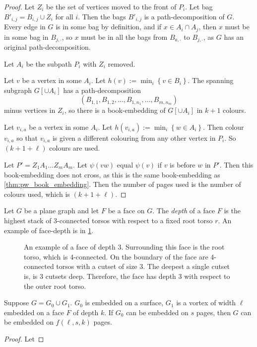 \begin{proof}
	Let $Z_i$ be the set of vertices moved to the front of $P_i$. Let bag $B'_{i,j} = B_{i,j} \cup Z_i$ for all $i$. Then the bags $B'_{i,j}$ is a path-decomposition of $G$. Every edge in $G$ is in some bag by definition, and if $x \in A_i \cap A_j$, then $x$ must be in some bag in $B_{j, \cdot}$, so $x$ must be in all the bags from $B_{a, \cdot}$ to $B_{j, \cdot}$, as $G$ has an original path-decomposition.  
	
	Let $A_i$ be the subpath $P_i$ with $Z_i$ removed. 

	Let $v$ be a vertex in some $A_i$. Let $h(v):= \min_i\left\{ v \in B_i \right\}$. The spanning subgraph $G[\cup A_i]$ has a path-decomposition \[(B_{1,1}, B_{1,2}, \ldots, B_{1,n_{1}}, \ldots, B_{m, n_{m}})\] minus vertices in $Z_i$, so there is a book-embedding of $G[\cup A_i]$ in $k + 1$ colours.
	
	Let $v_{i,a}$ be a vertex in some $A_i$. Let $h(v_{i,a}) := \min_i\left\{ w \in A_i \right\}$. Then colour $v_{i,a}$ so that $v_{i,a}$ is given a different colouring from any other vertex in $P_i$. So $(k + 1 + \ell)$ colours are used.


	Let $P' = Z_1 A_1 \ldots Z_m A_m$. Let $\psi(vw)$ equal $\psi(v)$ if $v$ is before $w$ in $P'$. Then this book-embedding does not cross, as this is the same book-embedding as \cref{thm:pw_book_embedding}. Then the number of pages used is the number of colours used, which is $(k + 1 + \ell)$. 

\end{proof}

Let $G$ be a plane graph and let $F$ be a face on $G$. The \textit{depth} of a face $F$ is the highest stack of 3-connected torsos with respect to a fixed root torso $r$. An example of face-depth is in \cref{fig:face_depth}.

\begin{figure}
	\centering
	
	\caption[Face of depth 3]{An example of a face of depth 3. Surrounding this face is the root torso, which is 4-connected. On the boundary of the face are 4-connected torsos with a cutset of size 3. The deepest a single cutset is, is 3 cutsets deep. Therefore, the face has depth 3 with respect to the outer root torso.}\label{fig:face_depth}
\end{figure}

\begin{proposition}
	Suppose $G = G_0 \cup G_1$. $G_0$ is embedded on a surface, $G_1$ is a vortex of width $\ell$ embedded on a face $F$ of depth $k$. If $G_0$ can be embedded on $s$ pages, then $G$ can be embedded on $f(\ell, s, k)$ pages.
\end{proposition}

\begin{proof}
	Let 
\end{proof}